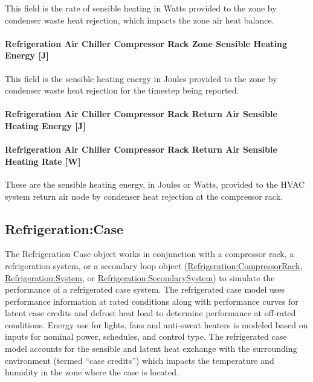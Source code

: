 This field is the rate of sensible heating in Watts provided to the zone by condenser waste heat rejection, which impacts the zone air heat balance.

\paragraph{Refrigeration Air Chiller Compressor Rack Zone Sensible Heating Energy {[}J{]}}\label{refrigeration-air-chiller-compressor-rack-zone-sensible-heating-energy-j}

This field is the sensible heating energy in Joules provided to the zone by condenser waste heat rejection for the timestep being reported.

\paragraph{Refrigeration Air Chiller Compressor Rack Return Air Sensible Heating Energy {[}J{]}}\label{refrigeration-air-chiller-compressor-rack-return-air-sensible-heating-energy-j}

\paragraph{Refrigeration Air Chiller Compressor Rack Return Air Sensible Heating Rate {[}W{]}}\label{refrigeration-air-chiller-compressor-rack-return-air-sensible-heating-rate-w}

These are the sensible heating energy, in Joules or Watts, provided to the HVAC system return air node by condenser heat rejection at the compressor rack.

\subsection{Refrigeration:Case}\label{refrigerationcase}

The Refrigeration Case object works in conjunction with a compressor rack, a refrigeration system, or a secondary loop object (\hyperref[refrigerationcompressorrack]{Refrigeration:CompressorRack}, \hyperref[refrigerationsystem]{Refrigeration:System}, or \hyperref[refrigerationsecondarysystem]{Refrigeration:SecondarySystem}) to simulate the performance of a refrigerated case system. The refrigerated case model uses performance information at rated conditions along with performance curves for latent case credits and defrost heat load to determine performance at off-rated conditions. Energy use for lights, fans and anti-sweat heaters is modeled based on inputs for nominal power, schedules, and control type. The refrigerated case model accounts for the sensible and latent heat exchange with the surrounding environment (termed ``case credits'') which impacts the temperature and humidity in the zone where the case is located.

